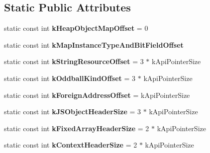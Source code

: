 \subsection*{Static Public Attributes}
\begin{DoxyCompactItemize}
\item 
\hypertarget{classv8_1_1internal_1_1Internals_a0902a596b5656b4592157eaacc020512}{}static const int {\bfseries k\+Heap\+Object\+Map\+Offset} = 0\label{classv8_1_1internal_1_1Internals_a0902a596b5656b4592157eaacc020512}

\item 
static const int {\bfseries k\+Map\+Instance\+Type\+And\+Bit\+Field\+Offset}
\item 
\hypertarget{classv8_1_1internal_1_1Internals_a8c2b35069864f567ca0c571310dd90a1}{}static const int {\bfseries k\+String\+Resource\+Offset} = 3 $\ast$ k\+Api\+Pointer\+Size\label{classv8_1_1internal_1_1Internals_a8c2b35069864f567ca0c571310dd90a1}

\item 
\hypertarget{classv8_1_1internal_1_1Internals_a98685d6861a07139720cd296f94f2b73}{}static const int {\bfseries k\+Oddball\+Kind\+Offset} = 3 $\ast$ k\+Api\+Pointer\+Size\label{classv8_1_1internal_1_1Internals_a98685d6861a07139720cd296f94f2b73}

\item 
\hypertarget{classv8_1_1internal_1_1Internals_ad4134449ee39b95e5ac035996aa7d66b}{}static const int {\bfseries k\+Foreign\+Address\+Offset} = k\+Api\+Pointer\+Size\label{classv8_1_1internal_1_1Internals_ad4134449ee39b95e5ac035996aa7d66b}

\item 
\hypertarget{classv8_1_1internal_1_1Internals_af8faf3ff3271d26bafa6ca0ea87e2a57}{}static const int {\bfseries k\+J\+S\+Object\+Header\+Size} = 3 $\ast$ k\+Api\+Pointer\+Size\label{classv8_1_1internal_1_1Internals_af8faf3ff3271d26bafa6ca0ea87e2a57}

\item 
\hypertarget{classv8_1_1internal_1_1Internals_a715ca62a5ddceac28d43c470db067675}{}static const int {\bfseries k\+Fixed\+Array\+Header\+Size} = 2 $\ast$ k\+Api\+Pointer\+Size\label{classv8_1_1internal_1_1Internals_a715ca62a5ddceac28d43c470db067675}

\item 
\hypertarget{classv8_1_1internal_1_1Internals_aa5187d7653158ef851c53594e6e63851}{}static const int {\bfseries k\+Context\+Header\+Size} = 2 $\ast$ k\+Api\+Pointer\+Size\label{classv8_1_1internal_1_1Internals_aa5187d7653158ef851c53594e6e63851}


\end{DoxyCompactItemize}
